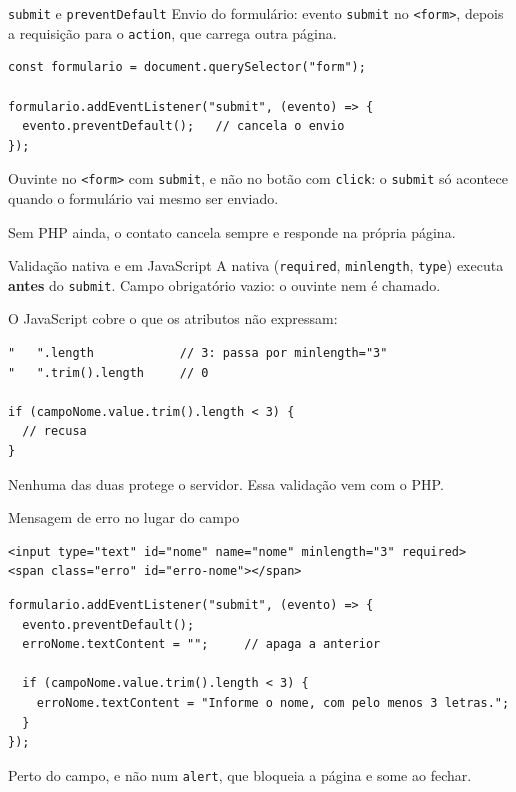 \documentclass{beamer}
\begin{document}
\begin{frame}[fragile]{\texttt{submit} e \texttt{preventDefault}}
	Envio do formulário: evento \texttt{submit} no \texttt{<form>}, depois a
	requisição para o \texttt{action}, que carrega outra página.

	\begin{verbatim}
const formulario = document.querySelector("form");

formulario.addEventListener("submit", (evento) => {
  evento.preventDefault();   // cancela o envio
});
	\end{verbatim}

	\vspace{0.2cm}
	Ouvinte no \texttt{<form>} com \texttt{submit}, e não no botão com
	\texttt{click}: o \texttt{submit} só acontece quando o formulário vai mesmo
	ser enviado.

	\vspace{0.2cm}
	Sem PHP ainda, o contato cancela sempre e responde na própria página.
\end{frame}

\begin{frame}[fragile]{Validação nativa e em JavaScript}
	A nativa (\texttt{required}, \texttt{minlength}, \texttt{type}) executa
	\textbf{antes} do \texttt{submit}. Campo obrigatório vazio: o ouvinte nem é
	chamado.

	\vspace{0.2cm}
	O JavaScript cobre o que os atributos não expressam:

	\begin{verbatim}
"   ".length            // 3: passa por minlength="3"
"   ".trim().length     // 0

if (campoNome.value.trim().length < 3) {
  // recusa
}
	\end{verbatim}

	Nenhuma das duas protege o servidor. Essa validação vem com o PHP.
\end{frame}

\begin{frame}[fragile]{Mensagem de erro no lugar do campo}
	\begin{verbatim}
<input type="text" id="nome" name="nome" minlength="3" required>
<span class="erro" id="erro-nome"></span>
	\end{verbatim}

	\begin{verbatim}
formulario.addEventListener("submit", (evento) => {
  evento.preventDefault();
  erroNome.textContent = "";     // apaga a anterior

  if (campoNome.value.trim().length < 3) {
    erroNome.textContent = "Informe o nome, com pelo menos 3 letras.";
  }
});
	\end{verbatim}

	Perto do campo, e não num \texttt{alert}, que bloqueia a página e some ao
	fechar.
\end{frame}
\end{document}

